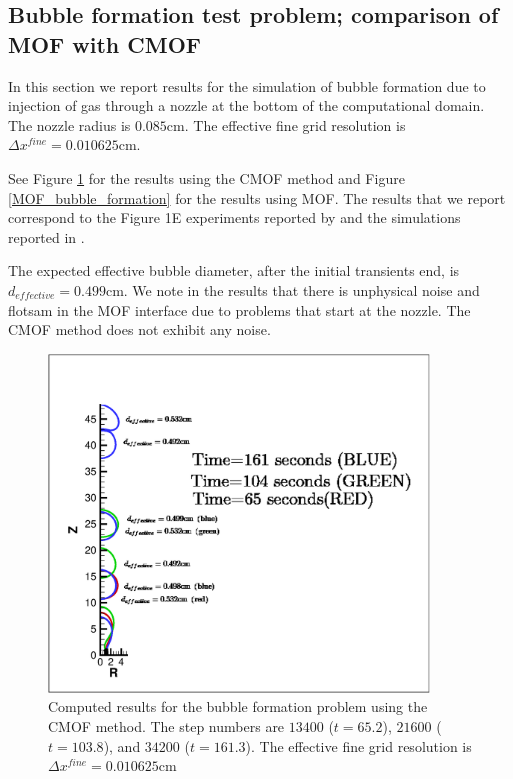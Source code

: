 \documentclass[]{article}
\begin{document}
\subsection{Bubble formation test problem; comparison of MOF with CMOF
  \label{bubform} }

In this section we report results for the simulation of bubble formation
due to injection of gas through a nozzle at the bottom of the computational
domain.  The nozzle radius is $0.085$cm.
The effective fine grid resolution is $\Delta x^{fine}=0.010625$cm.

See Figure \ref{CMOF_bubble_formation} for the results using
the CMOF method and Figure \ref{MOF_bubble_formation} for the results using
MOF.  The results that we report correspond to the Figure 1E 
experiments reported
by \cite{helsby1955behaviour} and the simulations reported in 
\cite{OHTA20111059}.

The expected effective bubble diameter, after the initial transients end,
is $d_{effective}=0.499$cm.  We note in the results that there is 
unphysical noise and flotsam in the MOF
interface due to problems that start at the nozzle. The CMOF method does
not exhibit any noise.  

\begin{figure}[htbp]
\centering
\includegraphics[width=0.9\textwidth]{CMOF_formation.eps} 
\caption{Computed results for the bubble formation problem using the
	CMOF method.  The step numbers are $13400$ ($t=65.2$), 
	$21600$ ($t=103.8$), and $34200$ ($t=161.3$).  The effective
	fine grid resolution is $\Delta x^{fine}=0.010625$cm}
 \label{CMOF_bubble_formation}
\end{figure}
\end{document}
